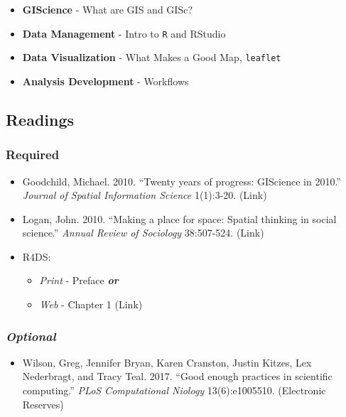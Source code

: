 \documentclass[
]{book}
\providecommand{\tightlist}{%
  \setlength{\itemsep}{0pt}\setlength{\parskip}{0pt}}
\begin{document}
\begin{itemize}
\tightlist
\item
  \textbf{GIScience} - What are GIS and GISc?
\item
  \textbf{Data Management} - Intro to \texttt{R} and RStudio
\item
  \textbf{Data Visualization} - What Makes a Good Map, \texttt{leaflet}
\item
  \textbf{Analysis Development} - Workflows
\end{itemize}

\hypertarget{readings-2}{%
\subsection*{Readings}\label{readings-2}}

\hypertarget{required-2}{%
\subsubsection*{Required}\label{required-2}}

\begin{itemize}
\tightlist
\item
  Goodchild, Michael. 2010. ``Twenty years of progress: GIScience in 2010.'' \emph{Journal of Spatial Information Science} 1(1):3-20. (Link)
\item
  Logan, John. 2010. ``Making a place for space: Spatial thinking in social science.'' \emph{Annual Review of Sociology} 38:507-524. (Link)
\item
  R4DS:

  \begin{itemize}
  \tightlist
  \item
    \emph{Print} - Preface \textbf{\emph{or}}
  \item
    \emph{Web} - Chapter 1 (Link)
  \end{itemize}
\end{itemize}

\hypertarget{optional-1}{%
\subsubsection*{\texorpdfstring{\emph{Optional}}{Optional}}\label{optional-1}}

\begin{itemize}
\tightlist
\item
  Wilson, Greg, Jennifer Bryan, Karen Cranston, Justin Kitzes, Lex Nederbragt, and Tracy Teal. 2017. ``Good enough practices in scientific computing.'' \emph{PLoS Computational Niology} 13(6):e1005510. (Electronic Reserves)
\end{itemize}
\end{document}
